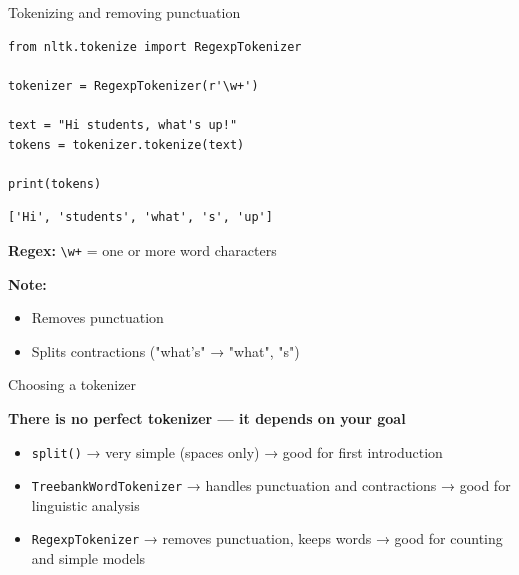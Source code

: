 \documentclass[handout]{beamer}
\begin{document}
\begin{frame}[fragile]{Tokenizing and removing punctuation}
\begin{verbatim}
from nltk.tokenize import RegexpTokenizer

tokenizer = RegexpTokenizer(r'\w+')

text = "Hi students, what's up!"
tokens = tokenizer.tokenize(text)

print(tokens)
\end{verbatim}

\pause

\begin{verbatim}
['Hi', 'students', 'what', 's', 'up']
\end{verbatim}

\pause

\textbf{Regex:} \texttt{\textbackslash w+} = one or more word characters

\pause

\textbf{Note:}
\begin{itemize}
\item Removes punctuation
\item Splits contractions ("what's" → "what", "s")
\end{itemize}
\end{frame}

\begin{frame}{Choosing a tokenizer}

\textbf{There is no perfect tokenizer — it depends on your goal}

\vspace{1em}

\begin{itemize}
\item \texttt{split()}  
→ very simple (spaces only)  
→ good for first introduction  

\vspace{0.5em}

\item \texttt{TreebankWordTokenizer}  
→ handles punctuation and contractions  
→ good for linguistic analysis  

\vspace{0.5em}

\item \texttt{RegexpTokenizer}  
→ removes punctuation, keeps words  
→ good for counting and simple models  
\end{itemize}

\end{frame}
\end{document}
